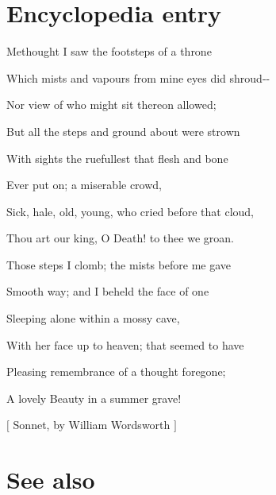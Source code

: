 \section{Encyclopedia entry}
\label{12}

Methought I saw the footsteps of a throne$\text{ }$\newline{}

Which mists and vapours from mine eyes did shroud-{}-{}$\text{ }$\newline{}

Nor view of who might sit thereon allowed;$\text{ }$\newline{}

But all the steps and ground about were strown$\text{ }$\newline{}

With sights the ruefullest that flesh and bone$\text{ }$\newline{}

Ever put on; a miserable crowd,$\text{ }$\newline{}

Sick, hale, old, young, who cried before that cloud,$\text{ }$\newline{}

Thou art our king, O Death! to thee we groan.$\text{ }$\newline{}


Those steps I clomb; the mists before me gave$\text{ }$\newline{}

Smooth way; and I beheld the face of one$\text{ }$\newline{}

Sleeping alone within a mossy cave,$\text{ }$\newline{}

With her face up to heaven; that seemed to have$\text{ }$\newline{}

Pleasing remembrance of a thought foregone;$\text{ }$\newline{}

A lovely Beauty in a summer grave!$\text{ }$\newline{}




{$\text{[}$} Sonnet, by William Wordsworth {$\text{]}$} 

\section{See also}
\label{13}

